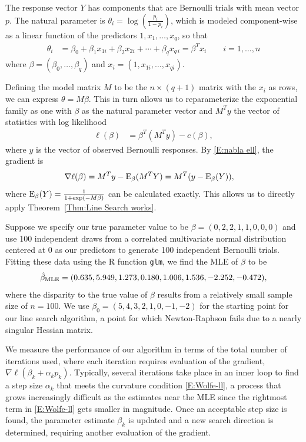 The response vector $Y$ has components that are Bernoulli trials with mean vector $p$.  
The natural parameter is $
\theta_i = \log \left( \frac{p_i}{1-p_i} \right )$, which is modeled component-wise as 
a linear function of the 
predictors $1, x_1, \ldots, x_{q}$, so that
\begin{align*}
	\theta_i &= \beta_0 + \beta_1 x_{1i} + \beta_2 x_{2i} + \cdots + \beta_{q} x_{q
\,i} = \beta^T x_i \qquad
i = 1, \ldots, n
\end{align*}
where $\beta = (\beta_0, \ldots, \beta_{q} )$ and $x_i = ( 1, x_{1i}, \ldots, x_{q 
i})$.  

Defining the model matrix $M$ to be the $n \times (q+1)$ matrix with the $x_i$ as 
rows, we can express $\theta = M \beta
$.  This in turn allows us to reparameterize the exponential family  as one with $
\beta$ as the natural parameter 
vector and $M^T y$ the vector of statistics with log likelihood
\begin{align*}
		 \ell(\beta) &=  \beta^T (M^T y) - c(\beta),
\end{align*}
where $y$ is the vector of observed Bernoulli responses.
By \eqref{E:nabla ell}, the gradient is
\begin{align*}
	\nabla \ell( \beta ) &=  M^T y - \operatorname{E}_{\beta}(M^T Y) = M^T( y - \operatorname{E}_{\beta}(Y) ),
\end{align*}
where $\operatorname{E}_{\beta}(Y) = \frac{1}{1 + \exp(-M \beta)}$ can be calculated exactly.  This 
allows us to directly apply 
Theorem~\ref{Thm:Line Search works}.

Suppose we specify our true parameter value to be $\beta = (0, 2, 2, 1, 1, 0, 0, 0)$ 
and use 100 independent draws 
from a correlated multivariate normal distribution centered at 0 as our predictors to 
generate 100 independent 
Bernoulli trials.  
Fitting these data using the R function \texttt{glm}, we find the MLE of $\beta$ to be
\begin{align*}
	\hat{\beta}_{\textrm{MLE}} = (  0.635,  5.949, 1.273, 0.180, 1.006, 1.536, -2.252, -0.472 ),
\end{align*}
where the disparity to the true value of $\beta$ results from a relatively small 
sample size of $n=100$.
We use $\beta_0 = ( 5, 4, 3, 2, 1, 0, -1, -2)$ for the starting point for our line 
search algorithm, a point for 
which Newton-Raphson fails due to a nearly singular Hessian matrix.  

We measure the performance of our algorithm in terms of the total number of iterations 
used, where each iteration 
requires evaluation of the gradient, $\nabla \ell( \beta_k + \alpha_k p_k )$.  
Typically, several iterations take 
place in an inner loop to find a step size $\alpha_k$ that meets the curvature 
condition \eqref{E:Wolfe-ll}, a 
process that grows increasingly difficult as the estimates near the MLE since the 
rightmost term in \eqref{E:Wolfe-ll} gets smaller in magnitude.  
Once an acceptable step size is found, the parameter 
estimate $\beta_k$ is updated and 
a new search direction is determined, requiring another evaluation of the gradient.

